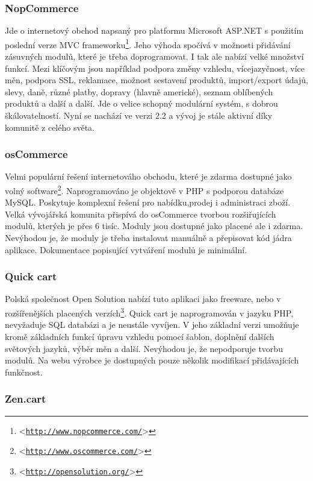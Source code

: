 \documentclass[11pt,twoside,a4paper]{book}
\let\oldUrl\url
\renewcommand\url[1]{<\texttt{\oldUrl{#1}}>}
\begin{document}
\subsubsection{NopCommerce}
\label{nop}
Jde o internetový obchod napsaný pro platformu Microsoft ASP.NET s použitím poslední verze MVC frameworku\footnote{\url{http://www.nopcommerce.com/}}. Jeho výhoda spočívá v možnosti přidávání zásuvných modulů, které je třeba doprogramovat. I tak ale nabízí velké množství funkcí. Mezi klíčovým jsou například podpora změny vzhledu, vícejazyčnost, více měn, podpora SSL, reklamace, možnost sestavení produktů, import/export údajů, slevy, daně, různé platby, dopravy (hlavně americké), seznam oblíbených produktů a další a další. Jde o velice schopný modulární systém, s dobrou škálovatelností. Nyní se nachází ve verzi 2.2 a vývoj je stále aktivní díky komunitě z celého světa.

\subsubsection{osCommerce}

Velmi populární řešení internetováho obchodu, které je zdarma dostupné jako volný software\footnote{\url{http://www.oscommerce.com/}}. Naprogramováno je objektově v PHP s podporou databáze MySQL. Poskytuje komplexní řešení pro nabídku,prodej i administraci zboží. Velká vývojářská komunita přispívá do osCommerce tvorbou rozšiřujících modulů, kterých je přes 6 tisíc. Moduly jsou dostupné jako placené ale i zdarma.  Nevýhodou je, že moduly je třeba instalovat manuálně a přepisovat kód jádra aplikace. Dokumentace popisující vytváření modulů je minimální.

\subsubsection{Quick cart}

Polská společnost Open Solution nabízí tuto aplikaci jako freeware, nebo v rozšířenějších placených verzích\footnote{\url{http://opensolution.org/}}. Quick cart je naprogramován v jazyku PHP, nevyžaduje SQL databázi a je neustále vyvíjen. V jeho základní verzi umožňuje kromě základních funkcí úpravu vzhledu pomocí šablon, doplnění dalších světových jazyků, výběr měn a další. Nevýhodou je, že nepodporuje tvorbu modulů. Na webu výrobce je dostupných pouze několik modifikací přidávajících funkčnost. 

\subsubsection{Zen.cart}
\end{document}
